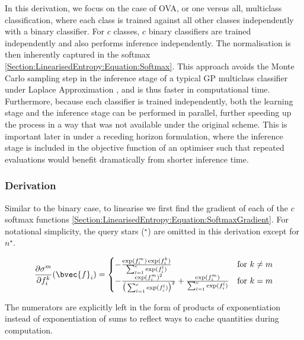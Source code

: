 \documentclass{article}
\begin{document}
		In this derivation, we focus on the case of OVA, or one versus all, multiclass classification, where each class is trained against all other classes independently with a binary classifier. For $c$ classes, $c$ binary classifiers are trained independently and also performs inference independently. The normalisation is then inherently captured in the softmax \eqref{Section:LinearisedEntropy:Equation:Softmax}. This approach avoids the Monte Carlo sampling step in the inference stage of a typical GP multiclass classifier under Laplace Approximation \cite{GaussianProcessForMachineLearning}, and is thus faster in computational time. Furthermore, because each classifier is trained independently, both the learning stage and the inference stage can be performed in parallel, further speeding up the process in a way that was not available under the original scheme. This is important later in under a receding horizon formulation, where the inference stage is included in the objective function of an optimiser such that repeated evaluations would benefit dramatically from shorter inference time.
		
		\subsubsection{Derivation}
		
			Similar to the binary case, to linearise we first find the gradient of each of the $c$ softmax functions \eqref{Section:LinearisedEntropy:Equation:SoftmaxGradient}. For notational simplicity, the query stars ($^{\star}$) are omitted in this derivation except for $n^{\star}$.
			
			\begin{equation}
				\frac{\partial \sigma^{m}}{\partial f^{k}_{i}}(\bvec{f}_{i}) =
				\begin{cases} 
					- \frac{\exp(f^{m}_{i}) \exp(f^{k}_{i})}{\sum_{l = 1}^{c} \exp(f^{l}_{i})} & \text{for } k \neq m  \\
					- \frac{\exp(f^{m}_{i})^{2}}{\big(\sum_{l = 1}^{c} \exp(f^{l}_{i})\big)^{2}} + \frac{\exp(f^{m}_{i})}{\sum_{l = 1}^{c} \exp(f^{l}_{i})}& \text{for } k = m
				\end{cases}
			\label{Section:LinearisedEntropy:Equation:SoftmaxGradient}
			\end{equation}			
		
			The numerators are explicitly left in the form of products of exponentiation instead of exponentiation of sums to reflect ways to cache quantities during computation. 
			
\end{document}
